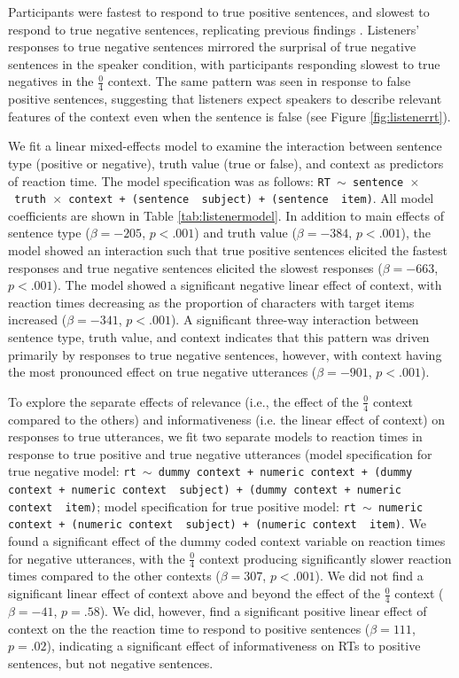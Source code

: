 \documentclass[man, noapacite]{apa2}
\begin{document}
Participants were fastest to respond to true positive sentences, and slowest to respond to true negative sentences, replicating previous findings \cite{hclark1972}.  Listeners' responses to true negative sentences mirrored the surprisal of true negative sentences in the speaker condition, with participants responding slowest to true negatives in the $\frac{0}{4}$ context.  The same pattern was seen in response to false positive sentences, suggesting that listeners expect speakers to describe relevant features of the context even when the sentence is false (see Figure \ref{fig:listenerrt}).

We fit a linear mixed-effects model to examine the interaction between sentence type (positive or negative), truth value (true or false), and context as predictors of reaction time. The model specification was as follows: \texttt{RT $\sim$ sentence~$\times$~truth~$\times$~context + (sentence~\textbar~subject) +  (sentence~\textbar~item)}. All model coefficients are shown in Table \ref{tab:listenermodel}. In addition to main effects of sentence type ($\beta= -205$, $p< .001$) and truth value ($\beta= -384$, $p< .001$), the model showed an interaction such that true positive sentences elicited the fastest responses and true negative sentences elicited the slowest responses ($\beta= -663$, $p< .001$). The model showed a significant negative linear effect of context, with reaction times decreasing as the proportion of characters with target items increased ($\beta= -341$, $p< .001$). A significant three-way interaction between sentence type, truth value, and context indicates that this pattern was driven primarily by responses to true negative sentences, however, with context having the most pronounced effect on true negative utterances ($\beta= -901$, $p< .001$).

To explore the separate effects of relevance (i.e., the effect of the $\frac{0}{4}$ context compared to the others) and informativeness (i.e. the linear effect of context) on responses to true utterances, we fit two separate models to reaction times in response to true positive and true negative utterances (model specification for true negative model: \texttt{rt $\sim$  dummy context + numeric context + (dummy context + numeric context~\textbar~subject) +  (dummy context + numeric context~\textbar~item)}; model specification for true positive model: \texttt{rt $\sim$  numeric context + (numeric context~\textbar~subject) +  (numeric context~\textbar~item)}. We found a significant effect of the dummy coded context variable on reaction times for negative utterances, with the $\frac{0}{4}$ context producing significantly slower reaction times compared to the other contexts ($\beta= 307$, $p< .001$). We did not find a significant linear effect of context above and beyond the effect of the  $\frac{0}{4}$ context ($\beta= -41$, $p = .58$). We did, however, find a significant positive linear effect of context on the the reaction time to respond to positive sentences ($\beta= 111$, $p = .02$), indicating a significant effect of informativeness on RTs to positive sentences, but not negative sentences.
\end{document}
